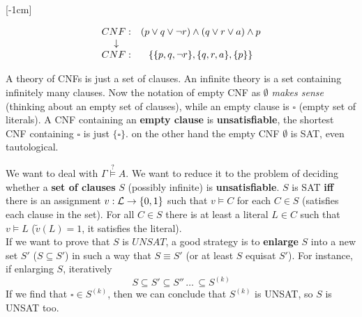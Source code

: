 \vspace{-0.6cm}

[-1cm]

\begin{example}
$$
\begin{array}{c c}
	CNF: & (p \vee q \vee \neg r) \wedge (q \vee r \vee a) \wedge p \\
	\downarrow & \\
	CNF: & \left\{\{p, q, \neg r\}, \{q,r,a\}, \{p\}\right\}
\end{array}
$$
\end{example}

A theory of CNFs is just a set of clauses. An infinite theory is a set containing infinitely many clauses. Now the notation of empty CNF as $\emptyset$ \textit{makes sense} (thinking about an empty set of clauses), while an empty clause is $\square$ (empty set of literals). A CNF containing an \textbf{empty clause} is \textbf{unsatisfiable}, the shortest CNF containing $\square$ is just $\{\square\}$. on the other hand the empty CNF $\emptyset$ is SAT, even tautological.

We want to deal with $\Gamma \stackrel{?}{\models} A$. We want to reduce it to the problem of deciding whether a \textbf{set of clauses} $S$ (possibly infinite) is \textbf{unsatisfiable}. $S$ is SAT \textbf{iff} there is an assignment $v: \mathcal{L} \rightarrow \{0,1\}$ such that $v \models C$ for each $C \in S$ (satisfies each clause in the set). For all $C \in S$ there is at least a literal $L \in C$ such that $v \models L$ ($\tilde v (L) = 1$, it satisfies the literal).\\

If we want to prove that $S$ is $UNSAT$, a good strategy is to \textbf{enlarge} $S$ into a new set $S'$ ($S \subseteq S'$) in such a way that $S \equiv S'$ (or at least $S$ equisat $S'$). For instance, if enlarging $S$, iteratively
$$ S \subseteq S' \subseteq S'' \, \dots \, \subseteq S^{(k)}$$
If we find that $\square \in S^{(k)}$, then we can conclude that $S^{(k)}$ is UNSAT, so $S$ is UNSAT too.

\newpage

